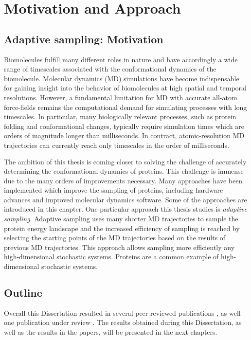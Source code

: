 \chapter{Motivation and Approach}

\section{Adaptive sampling: Motivation}
Biomolecules fulfill many different roles in nature and have accordingly a wide range of timescales associated with the conformational dynamics of the biomolecule. Molecular dynamics (MD) simulations have become indispensable for gaining
insight into the behavior of biomolecules at high spatial and temporal resolutions.
However, a fundamental limitation for MD with accurate all-atom force-fields remains
the computational demand for simulating processes with long timescales. In
particular, many biologically relevant processes, such as protein folding and
conformational changes, typically require simulation times which are orders of magnitude longer than
milliseconds. In contract, atomic-resolution MD trajectories can currently reach only timescales in the order of milliseconds. 

The ambition of this thesis is coming closer to solving the challenge of accurately determining the conformational dynamics of proteins. This challenge is immense due to the many orders of improvements necessary. Many approaches have been implemented which improve the sampling of proteins, including hardware advances and improved molecular dynamics software. Some of the approaches are introduced in this chapter. One particular approach this thesis studies is \emph{adaptive sampling}. Adaptive sampling uses many shorter MD trajectories to sample the protein energy landscape and the increased efficiency of sampling is reached by selecting the starting points of the MD trajectories based on the results of previous MD trajectories. This approach allows sampling more efficiently any high-dimensional stochastic systems. Proteins are a common example of high-dimensional stochastic systems.

\section{Outline}
 
Overall this Dissertation resulted in several peer-reviewed publications \cite{Adstrategies2018, Extasy2016}, as well one publication under review \cite{Extasy2019}. The results obtained during this Dissertation, as well as the results in the papers, will be presented in the next chapters.
 

